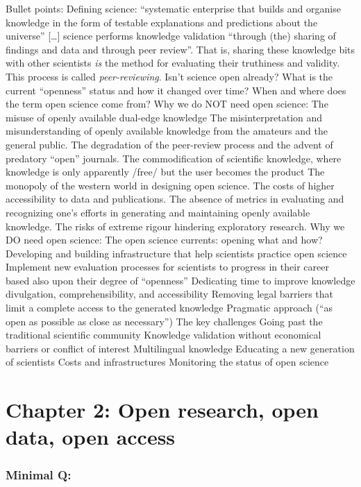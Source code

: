 \documentclass[
]{book}
\theoremstyle{definition}
\theoremstyle{definition}
\theoremstyle{definition}
\theoremstyle{definition}
\theoremstyle{remark}
\begin{document}
Bullet points:
Defining science: ``systematic enterprise that builds and organise knowledge in the form of testable explanations and predictions about the universe'' {[}\ldots{]} science performs knowledge validation ``through (the) sharing of findings and data and through peer review''. That is, sharing these knowledge bits with other scientists \emph{is} the method for evaluating their truthiness and validity. This process is called \emph{peer-reviewing}.
Isn't science open already? What is the current ``openness'' status and how it changed over time? When and where does the term open science come from?
Why we do NOT need open science:
The misuse of openly available dual-edge knowledge
The misinterpretation and misunderstanding of openly available knowledge from the amateurs and the general public.
The degradation of the peer-review process and the advent of predatory ``open'' journals.
The commodification of scientific knowledge, where knowledge is only apparently /free/ but the user becomes the product
The monopoly of the western world in designing open science.
The costs of higher accessibility to data and publications.
The absence of metrics in evaluating and recognizing one's efforts in generating and maintaining openly available knowledge.
The risks of extreme rigour hindering exploratory research.
Why we DO need open science:
The open science currents: opening what and how?
Developing and building infrastructure that help scientists practice open science
Implement new evaluation processes for scientists to progress in their career based also upon their degree of ``openness''
Dedicating time to improve knowledge divulgation, comprehensibility, and accessibility
Removing legal barriers that limit a complete access to the generated knowledge
Pragmatic approach (``as open as possible as close as necessary'')
The key challenges
Going past the traditional scientific community
Knowledge validation without economical barriers or conflict of interest
Multilingual knowledge
Educating a new generation of scientists
Costs and infrastructures
Monitoring the status of open science

\hypertarget{chapter-2-open-research-open-data-open-access}{%
\chapter{Chapter 2: Open research, open data, open access}\label{chapter-2-open-research-open-data-open-access}}

\hypertarget{minimal-q}{%
\subsection{Minimal Q:}\label{minimal-q}}
\end{document}
